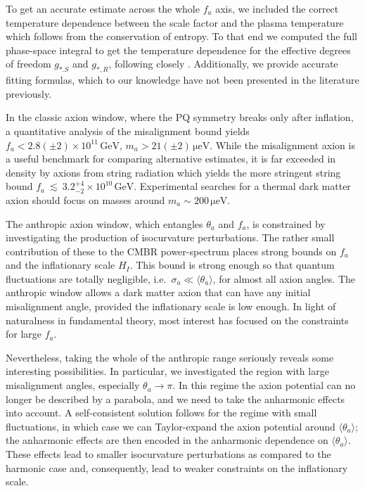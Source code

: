 \documentclass[preprint,nofootinbib]{revtex4}
\newcommand{\units}[1]{\, \mathrm{#1}}
\begin{document}
To get an accurate estimate across the whole $f_a$ axis, we included the correct temperature dependence between the scale factor and the plasma temperature which follows from the conservation of entropy. To that end we computed the full phase-space integral to get the temperature dependence for the effective degrees of freedom $g_{*.S}$ and $g_{*,R}$, following closely \cite{coleman:roos:geff}. Additionally, we provide accurate fitting formulas, which to our knowledge have not been presented in the literature previously.

In the classic axion window, where the PQ symmetry breaks only after inflation, a quantitative analysis of the misalignment bound yields $f_a < 2.8(\pm2) \times 10^{11}\units{GeV}$, $m_a>21(\pm 2) \units{\mu eV}$. While the misalignment axion is a useful benchmark for comparing alternative estimates, it is far exceeded in density by axions from string radiation which yields the more stringent string bound $f_a~\lesssim~3.2^{+4}_{-2} \times 10^{10} \units{GeV}$. Experimental searches for a thermal dark matter axion should focus on masses around $m_a \sim 200 \units{\mu eV}$.

The anthropic axion window, which entangles $\theta_a$ and $f_a$, is constrained by investigating the production of isocurvature perturbations. The rather small contribution of these to the CMBR power-spectrum places strong bounds on $f_a$ and the inflationary scale $H_I$. This bound is strong enough so that quantum fluctuations are totally negligible, i.e.\ $\sigma_a \ll \langle \theta_a \rangle$, for almost all axion angles. The anthropic window allows a dark matter axion that can have any initial misalignment angle, provided the inflationary scale is low enough. In light of naturalness in fundamental theory, most interest has focused on the constraints for large $f_a$.

Nevertheless, taking the whole of the anthropic range seriously reveals some interesting possibilities. In particular, we investigated the region with large misalignment angles, especially $\theta_a \to \pi$. In this regime the axion potential can no longer be described by a parabola, and we need to take the anharmonic effects into account. A self-consistent solution follows for the regime with small fluctuations, in which case we can Taylor-expand the axion potential around $\langle \theta_a \rangle$; the anharmonic effects are then encoded in the anharmonic dependence on $\langle \theta_a \rangle$. These effects lead to smaller isocurvature perturbations as compared to the harmonic case and, consequently, lead to weaker constraints on the inflationary scale.
\end{document}
